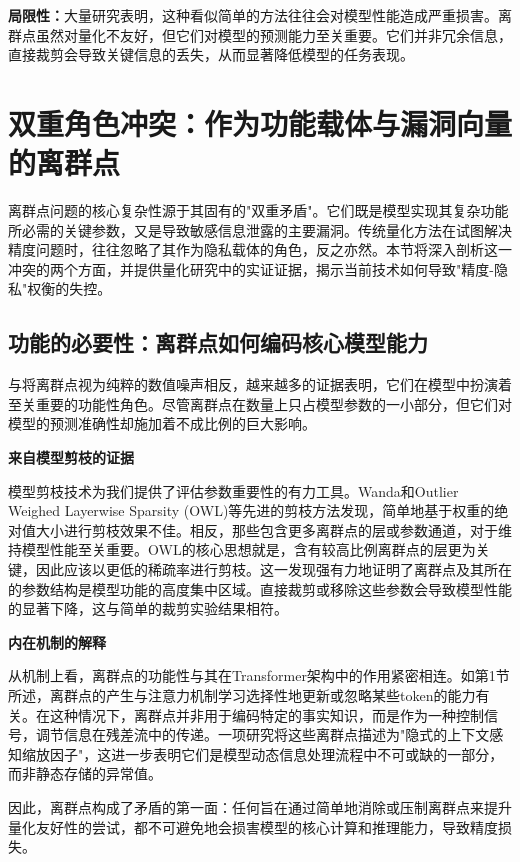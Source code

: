 \documentclass[letterpaper,twocolumn,10pt]{article}
\begin{document}
\textbf{局限性：}大量研究表明，这种看似简单的方法往往会对模型性能造成严重损害。离群点虽然对量化不友好，但它们对模型的预测能力至关重要。它们并非冗余信息，直接裁剪会导致关键信息的丢失，从而显著降低模型的任务表现。

\section{双重角色冲突：作为功能载体与漏洞向量的离群点}

离群点问题的核心复杂性源于其固有的"双重矛盾"。它们既是模型实现其复杂功能所必需的关键参数，又是导致敏感信息泄露的主要漏洞。传统量化方法在试图解决精度问题时，往往忽略了其作为隐私载体的角色，反之亦然。本节将深入剖析这一冲突的两个方面，并提供量化研究中的实证证据，揭示当前技术如何导致"精度-隐私"权衡的失控。

\subsection{功能的必要性：离群点如何编码核心模型能力}

与将离群点视为纯粹的数值噪声相反，越来越多的证据表明，它们在模型中扮演着至关重要的功能性角色。尽管离群点在数量上只占模型参数的一小部分，但它们对模型的预测准确性却施加着不成比例的巨大影响。

\textbf{来自模型剪枝的证据}

模型剪枝技术为我们提供了评估参数重要性的有力工具。Wanda和Outlier Weighed Layerwise Sparsity (OWL)等先进的剪枝方法发现，简单地基于权重的绝对值大小进行剪枝效果不佳。相反，那些包含更多离群点的层或参数通道，对于维持模型性能至关重要。OWL的核心思想就是，含有较高比例离群点的层更为关键，因此应该以更低的稀疏率进行剪枝。这一发现强有力地证明了离群点及其所在的参数结构是模型功能的高度集中区域。直接裁剪或移除这些参数会导致模型性能的显著下降，这与简单的裁剪实验结果相符。

\textbf{内在机制的解释}

从机制上看，离群点的功能性与其在Transformer架构中的作用紧密相连。如第1节所述，离群点的产生与注意力机制学习选择性地更新或忽略某些token的能力有关。在这种情况下，离群点并非用于编码特定的事实知识，而是作为一种控制信号，调节信息在残差流中的传递。一项研究将这些离群点描述为"隐式的上下文感知缩放因子"，这进一步表明它们是模型动态信息处理流程中不可或缺的一部分，而非静态存储的异常值。

因此，离群点构成了矛盾的第一面：任何旨在通过简单地消除或压制离群点来提升量化友好性的尝试，都不可避免地会损害模型的核心计算和推理能力，导致精度损失。
\end{document}
